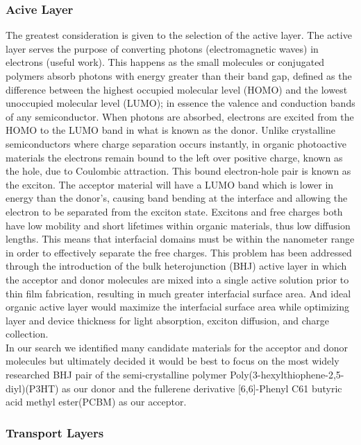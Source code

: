\subsubsection{Acive Layer}
	
	The greatest consideration is given to the selection of the active layer. The active layer serves the purpose of converting photons (electromagnetic waves) in electrons (useful work). This happens as the small molecules or conjugated polymers absorb photons with energy greater than their band gap, defined as the difference between the highest occupied molecular level (HOMO) and the lowest unoccupied molecular level (LUMO); in essence the valence and conduction bands of any semiconductor. When photons are absorbed, electrons are excited from the HOMO to the LUMO band in what is known as the donor. Unlike crystalline semiconductors where charge separation occurs instantly, in organic photoactive materials the electrons remain bound to the left over positive charge, known as the hole, due to Coulombic attraction. This bound electron-hole pair is known as the exciton. The acceptor material will have a LUMO band which is lower in energy than the donor's, causing band bending at the interface and allowing the electron to be separated from the exciton state. Excitons and free charges both have low mobility and short lifetimes within organic materials, thus low diffusion lengths. This means that interfacial domains must be within the nanometer range in order to effectively separate the free charges. This problem has been addressed through the introduction of the bulk heterojunction (BHJ) active layer in which the acceptor and donor molecules are mixed into a single active solution prior to thin film fabrication, resulting in much greater interfacial surface area. And ideal organic active layer would maximize the interfacial surface area while optimizing layer and device thickness for light absorption, exciton diffusion, and charge collection.\\
	
	In our search we identified many candidate materials for the acceptor and donor molecules but ultimately decided it would be best to focus on the most widely researched BHJ pair of the semi-crystalline polymer Poly(3-hexylthiophene-2,5-diyl)(P3HT) as our donor and the fullerene derivative [6,6]-Phenyl C61 butyric acid methyl ester(PCBM) as our acceptor.\\
	
\subsubsection{Transport Layers}
	
